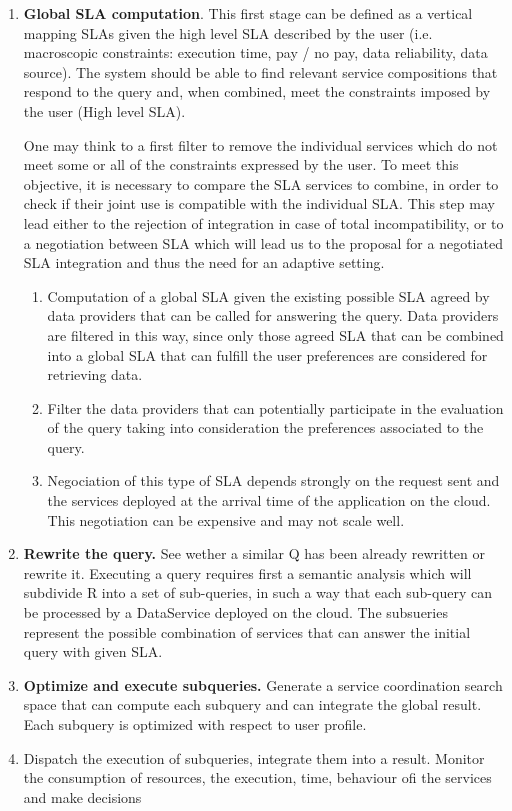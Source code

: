 \begin{enumerate}

\item  {\bf Global SLA computation}. 
This first stage can be defined as a vertical mapping SLAs given the high level SLA described by the user (i.e. macroscopic constraints: execution time, pay / no pay, data reliability, data source). The system should be able to find relevant service compositions that respond to the query and, when combined, meet the constraints imposed by the user (High level SLA).

One may think to a first filter to remove the individual services which do not meet some or all of the constraints expressed by the user. 
To meet this objective, it is necessary to compare the SLA services to combine, in order to check if their joint use is compatible with the individual SLA. This step may lead either to the rejection of integration in case of total incompatibility, or to a negotiation between SLA which will lead us to the proposal for a negotiated SLA integration and thus the need for an adaptive setting.


 \begin{enumerate}
\item Computation of a global SLA given the existing possible SLA agreed by data providers that can be called for answering the query. Data providers are filtered in this way, since only those agreed SLA that can be combined into a global SLA that can fulfill the user preferences are considered for retrieving data.

  
  \item Filter the data providers that can potentially participate in the evaluation of the query taking into consideration the preferences associated to the query.
  
  \item Negociation of this type of SLA depends strongly on the request sent and the services deployed at the arrival time of the application on the cloud. This negotiation can be expensive and may not scale well.
  \end{enumerate}
  
  \item {\bf Rewrite the query.} See wether a similar Q has been already rewritten or rewrite it. Executing a query requires first a semantic analysis which will subdivide R into a set of sub-queries, in such a way that each sub-query can be processed by a DataService deployed on the cloud.   The subsueries represent the possible combination of services that can answer the initial query with given SLA.
 
  
  \item {\bf Optimize and execute subqueries.} Generate a service coordination search space that can compute each subquery and can integrate the global result. 
Each subquery is optimized with respect to user profile.

  \item Dispatch the execution of subqueries, integrate them into a result. Monitor the consumption of resources, the execution, time, behaviour ofi the services and make decisions
\end{enumerate}

